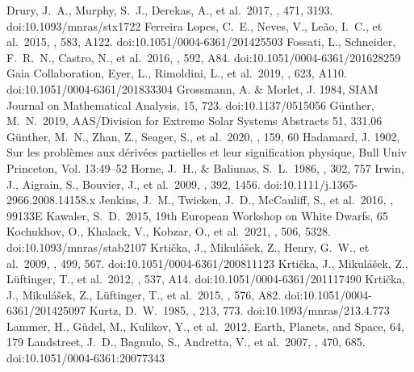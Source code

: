 \documentclass[RNAAS]{aastex63}
\begin{document}
\begin{thebibliography}{}
 Drury, J.~A., Murphy, S.~J., Derekas, A., et al.\ 2017, \mnras, 471, 3193. doi:10.1093/mnras/stx1722
 Ferreira Lopes, C.~E., Neves, V., Le{\~a}o, I.~C., et al.\ 2015, \aap, 583, A122. doi:10.1051/0004-6361/201425503
 Fossati, L., Schneider, F.~R.~N., Castro, N., et al.\ 2016, \aap, 592, A84. doi:10.1051/0004-6361/201628259
 Gaia Collaboration, Eyer, L., Rimoldini, L., et al.\ 2019, \aap, 623, A110. doi:10.1051/0004-6361/201833304
 Grossmann, A. \& Morlet, J. 1984,  SIAM Journal on Mathematical Analysis, 15, 723. doi:10.1137/0515056
 G{\"u}nther, M.~N.\ 2019, AAS/Division for Extreme Solar Systems Abstracts 51, 331.06
 G{\"u}nther, M.~N., Zhan, Z., Seager, S., et al.\ 2020, \aj, 159, 60
 Hadamard, J. 1902, Sur les probl\`emes aux d\'eriv\'ees partielles et leur signification physique, Bull Univ Princeton, Vol. 13:49–52
 Horne, J.~H., \& Baliunas, S.~L.\ 1986, \apj, 302, 757
 Irwin, J., Aigrain, S., Bouvier, J., et al.\ 2009, \mnras, 392, 1456. doi:10.1111/j.1365-2966.2008.14158.x
 Jenkins, J.~M., Twicken, J.~D., McCauliff, S., et al.\ 2016, \procspie, 99133E
 Kawaler, S.~D.\ 2015, 19th European Workshop on White Dwarfs, 65
 Kochukhov, O., Khalack, V., Kobzar, O., et al.\ 2021, \mnras, 506, 5328. doi:10.1093/mnras/stab2107
 Krti{\v{c}}ka, J., Mikul{\'a}{\v{s}}ek, Z., Henry, G.~W., et al.\ 2009, \aap, 499, 567. doi:10.1051/0004-6361/200811123
 Krti{\v{c}}ka, J., Mikul{\'a}{\v{s}}ek, Z., L{\"u}ftinger, T., et al.\ 2012, \aap, 537, A14. doi:10.1051/0004-6361/201117490
 Krti{\v{c}}ka, J., Mikul{\'a}{\v{s}}ek, Z., L{\"u}ftinger, T., et al.\ 2015, \aap, 576, A82. doi:10.1051/0004-6361/201425097
 Kurtz, D.~W.\ 1985, \mnras, 213, 773. doi:10.1093/mnras/213.4.773
 Lammer, H., G{\"u}del, M., Kulikov, Y., et al.\ 2012, Earth, Planets, and Space, 64, 179
 Landstreet, J.~D., Bagnulo, S., Andretta, V., et al.\ 2007, \aap, 470, 685. doi:10.1051/0004-6361:20077343

\end{thebibliography}
\end{document}
